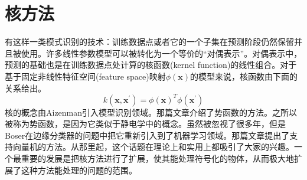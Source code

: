 \section{核方法}
有这样一类模式识别的技术：训练数据点或者它的一个子集在预测阶段仍然保留并且被使用。许多线性参数模型可以被转化为一个等价的“对偶表示”。对偶表示中，预测的基础也是在训练数据点处计算的核函数(kernel function)的线性组合。对于基于固定非线性特征空间(feature space)映射$\phi(\boldsymbol{x})$的模型来说，核函数由下面的关系给出。
\begin{equation}
	k(\boldsymbol{x},\boldsymbol{x}^{'})=\phi(\boldsymbol{x})^T\phi(\boldsymbol{x}^{'})
\end{equation}
核的概念由Aizenman引入模型识别领域。那篇文章介绍了势函数的方法。之所以被称为势函数，是因为它类似于静电学中的概念。虽然被忽视了很多年，但是Boser在边缘分类器的问题中把它重新引入到了机器学习领域。那篇文章提出了支持向量机的方法。从那里起，这个话题在理论上和实用上都吸引了大家的兴趣。一个最重要的发展是把核方法进行了扩展，使其能处理符号化的物体，从而极大地扩展了这种方法能处理的问题的范围。
